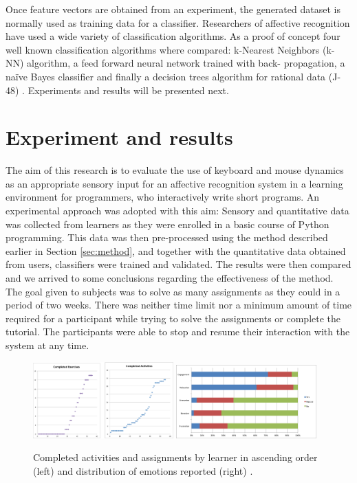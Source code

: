 \documentclass[a4paper,twoside]{article}
\begin{document}
Once feature vectors are obtained from an experiment, the generated dataset is
normally used as training data for a classifier. Researchers of affective
recognition have used a wide variety of classification algorithms. As a proof of
concept four well known classification algorithms where compared: k-Nearest
Neighbors (k-NN) algorithm, a feed forward neural network trained with back-
propagation, a na\"ive Bayes classifier and finally a decision trees algorithm for
rational data (J-48) \cite{tan2006introduction}. Experiments and results will be presented next.

\section{Experiment and results}
\label{sec:exp}
The aim of this research is to evaluate the use of keyboard
and mouse dynamics as an appropriate sensory input for an affective recognition
system in a learning environment for programmers,
who interactively write short programs. An experimental approach was adopted with this aim: Sensory and
quantitative data was collected from learners as they were enrolled in a basic
course of Python programming. This data was then pre-processed using the method
described earlier in Section \ref{sec:method}, and together with the quantitative data obtained from users,
classifiers were trained and validated. The results were then compared
and we arrived to some conclusions regarding the effectiveness of the method. The goal given to
subjects was to solve as many assignments as they could in a period of two weeks.
There was neither time limit nor a minimum amount of time required for a
participant while trying to solve the assignments or complete the tutorial. The
participants were able to stop and resume their interaction with the system at
any time.
%
\begin{figure}[!t]
\centering
\includegraphics[width=0.48\textwidth]{Completed.png}
\includegraphics[width=0.48\textwidth]{classDist.png}
\caption{Completed activities and assignments by learner in ascending order (left) and distribution of emotions reported (right) \cite{ijcci17}.}
\label{fig_completed}
\end{figure}
\end{document}

